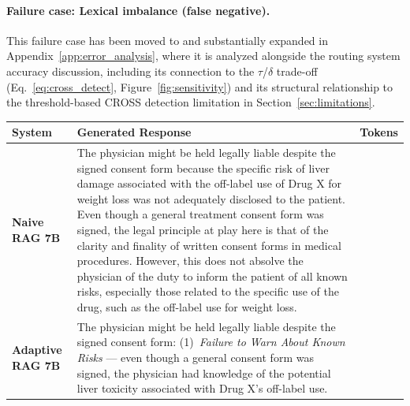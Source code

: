 \documentclass[a4paper,fleql]{cas-sc}
\begin{document}
\paragraph{Failure case: Lexical imbalance (false negative).}
This failure case has been moved to and substantially expanded in
Appendix~\ref{app:error_analysis}, where it is
analyzed alongside the routing system accuracy discussion, including its
connection to the $\tau$/$\delta$ trade-off (Eq.~\ref{eq:cross_detect},
Figure~\ref{fig:sensitivity}) and its structural relationship to the
threshold-based CROSS detection limitation in Section~\ref{sec:limitations}.

\clearpage
\vspace{6pt plus 4pt minus 3pt}
\begin{center}
\begingroup
{}
\label{tab:casestudy_comparison}
\renewcommand{\arraystretch}{1.4}
\footnotesize
\begin{tabular}{m{2.3cm} | m{10.0cm} | >{\centering\arraybackslash}m{1.5cm}}
\toprule
\textbf{System} & \textbf{Generated Response} & \textbf{Tokens} \\
\midrule
\textbf{Naive RAG 7B}
& The physician might be held legally liable despite the signed consent form
because the specific risk of liver damage associated with the off-label use of
Drug X for weight loss was not adequately disclosed to the patient. Even though
a general treatment consent form was signed, the legal principle at play here
is that of the clarity and finality of written consent forms in medical
procedures. However, this does not absolve the physician of the duty to inform
the patient of all known risks, especially those related to the specific use of
the drug, such as the off-label use for weight loss. & 102 \\
\midrule
\textbf{Adaptive RAG 7B}
& The physician might be held legally liable despite the signed consent form:
(1)~\textit{Failure to Warn About Known Risks} --- even though a general
consent form was signed, the physician had knowledge of the potential liver
toxicity associated with Drug X's off-label use.

\end{tabular}
\end{center}
\end{document}

